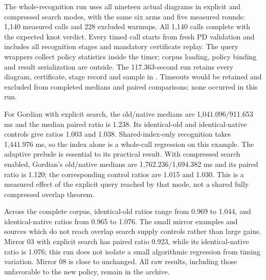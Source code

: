 

The whole-recognition run uses all nineteen actual diagrams in explicit and
compressed search modes, with the same six arms and five measured rounds:
1,140 measured calls and 228 excluded warmups. All 1,140 calls complete with
the expected knot verdict. Every timed call starts from fresh PD validation
and includes all recognition stages and mandatory certificate replay.
The query wrappers collect policy statistics inside the timer; corpus
loading, policy binding and result serialization are outside. The 117.363-second
run retains every diagram, certificate, stage record and sample in
. Timeouts would
be retained and excluded from completed medians and paired comparisons;
none occurred in this run.

For Gordian with explicit search, the old/native medians are
1,041.096/911.653 ms and the median paired ratio is 1.238. Its identical-old
and identical-native controls give ratios 1.003 and 1.038. Shared-index-only
recognition takes 1,441.976 ms, so the index alone is a whole-call regression
on this example. The adaptive prelude is essential to its practical result.
With compressed search enabled, Gordian's old/native medians are
1,762.236/1,694.382 ms and its paired ratio is 1.120; the corresponding
control ratios are 1.015 and 1.030. This is a measured effect of the explicit
query reached by that mode, not a shared fully compressed overlap theorem.

Across the complete corpus, identical-old ratios range from 0.969 to 1.044,
and identical-native ratios from 0.965 to 1.076. The small mirror examples
and sources which do not reach overlap search supply controls rather than
large gains. Mirror 03 with explicit search has paired ratio 0.923, while its
identical-native ratio is 1.076; this run does not isolate a small algorithmic
regression from timing variation. Mirror 08 is close to unchanged. All raw
results, including those unfavorable to the new policy, remain in the archive.
